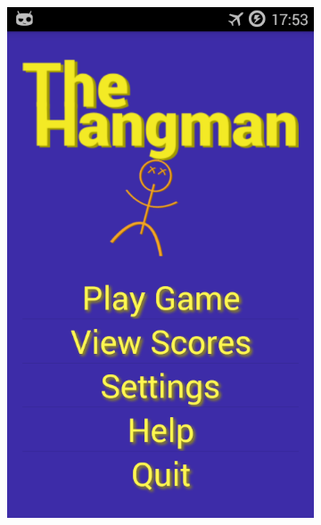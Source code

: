 \begin{figure}[ht]
\begin{subfigure}[b]{0.25\textwidth}
    \end{subfigure}
    \begin{subfigure}[b]{0.25\textwidth}
        \includegraphics[width=\textwidth]{./img/gui/a2.png}
    \end{subfigure}
    \begin{subfigure}[b]{0.25\textwidth}

\end{subfigure}
\end{figure}
